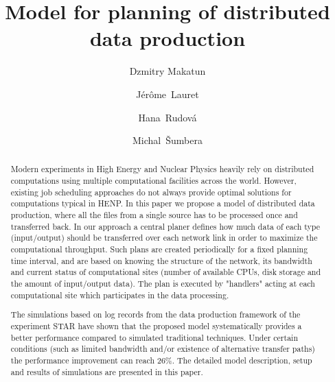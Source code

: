 \documentclass{svjour3}                     %
\begin{document}
\title{Model for planning of distributed data production}

\author{Dzmitry Makatun         \and
		J\'er\^ome~Lauret		\and
		Hana~Rudov\'a			\and
		Michal~\v{S}umbera	
}


\maketitle

\begin{abstract}
Modern experiments in High Energy and Nuclear Physics heavily rely on distributed computations using multiple computational facilities across the world. However, existing job scheduling approaches do not always provide optimal solutions for computations typical in HENP. In this paper we propose a model of distributed data production, where all the files from a single source has to be processed once and transferred back. In our approach a central planer defines how much data of each type (input/output) should be transferred over each network link in order to maximize the computational throughput. Such plans are created periodically for a fixed planning time interval, and are based on knowing the structure of the network, its bandwidth and current status of computational sites (number of available CPUs, disk storage and the amount of input/output data). The plan is executed by "handlers" acting at each computational site which participates in the data processing. 

The simulations based on log records from the data production framework of the experiment STAR have shown that the proposed model systematically provides a better performance compared to simulated traditional techniques. Under certain conditions (such as limited bandwidth and/or existence of alternative transfer paths) the performance improvement can reach 26\%. The detailed model description, setup and results of simulations are presented in this paper.
\end{abstract}
\end{document}

